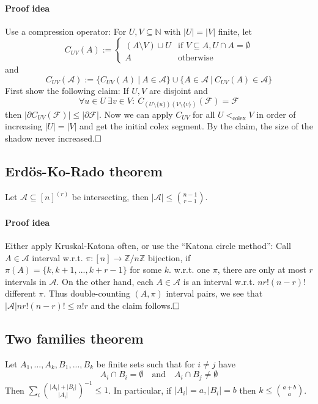 \documentclass{scrartcl}
\newcommand{\N}{\mathbb{N}}
\newcommand{\Z}{\mathbb{Z}}
\begin{document}
\paragraph{Proof idea} Use a compression operator: For $U, V \subseteq \N$ with $|U| = |V|$ finite, let
\begin{equation*}
    C_{UV}(A) := \begin{cases}
        (A \setminus V) \cup U & \text{if $V \subseteq A, U \cap A = \emptyset$} \\
        A & \text{otherwise}
    \end{cases}
\end{equation*}
and
\begin{equation*}
    C_{UV}(\mathcal{A}) := \{ C_{UV}(A) \ | \ A \in \mathcal{A} \} \cup \{ A \in \mathcal{A} \ | \ C_{UV}(A) \in \mathcal{A} \}
\end{equation*}
First show the following claim:
If $U, V$ are disjoint and
\begin{equation*}
    \forall u \in U \ \exists v \in V: \ C_{(U \setminus \{u\})(V \setminus \{v\})}(\mathcal{F}) = \mathcal{F}
\end{equation*}
then $|\partial C_{UV}(\mathcal{F})| \leq |\partial\mathcal{F}|$.
Now we can apply $C_{UV}$ for all $U <_{\mathrm{colex}} V$ in order of increasing $|U| = |V|$ and get the initial colex segment.
By the claim, the size of the shadow never increased.$\hfill\square$

\subsection{Erdös-Ko-Rado theorem}
Let $\mathcal{A} \subseteq [n]^{(r)}$ be intersecting, then $|\mathcal{A}| \leq {n - 1 \choose r - 1}$.
\paragraph{Proof idea} Either apply Kruskal-Katona often, or use the ``Katona circle method'':
Call $A \in \mathcal{A}$ interval w.r.t. $\pi: [n] \to \Z/n\Z$ bijection, if $\pi(A) = \{ k, k + 1, ..., k + r - 1 \}$ for some $k$.
w.r.t. one $\pi$, there are only at most $r$ intervals in $\mathcal{A}$.
On the other hand, each $A \in \mathcal{A}$ is an interval w.r.t. $nr!(n - r)!$ different $\pi$.
Thus double-counting $(A, \pi)$ interval pairs, we see that $|\mathcal{A}|nr!(n - r)! \leq n!r$ and the claim follows.$\hfill\square$

\subsection{Two families theorem}
Let $A_1, ..., A_k, B_1, ..., B_k$ be finite sets such that for $i \neq j$ have
\begin{equation*}
    A_i \cap B_i = \emptyset \quad \text{and} \quad A_i \cap B_j \neq \emptyset
\end{equation*}
Then $\sum_i {|A_i| + |B_i| \choose |A_i|}^{-1} \leq 1$. In particular, if $|A_i| = a, |B_i| = b$ then $k \leq {a + b \choose a}$.
\end{document}
